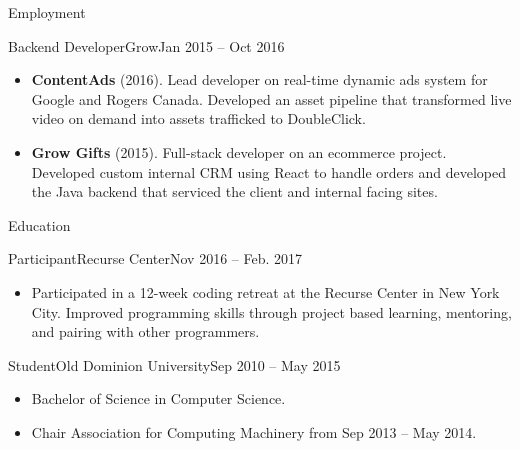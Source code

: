 \documentclass[]{mcdowellcv}
\begin{document}
\begin{cvsection}{Employment}
        \begin{cvsubsection}{Backend Developer}{Grow}{Jan 2015 – Oct 2016}
            \begin{itemize}
                \item \textbf{ContentAds} (2016). Lead developer on real-time dynamic ads system for Google and Rogers Canada. \newline 
                Developed an asset pipeline that transformed live video on demand into assets trafficked to DoubleClick.
            \end{itemize}
            \begin{itemize}
                \item \textbf{Grow Gifts} (2015). Full-stack developer on an ecommerce project. Developed custom internal CRM using React to handle orders and developed the Java backend that serviced the client and internal facing sites.
            \end{itemize}
        \end{cvsubsection}
    \end{cvsection}

    \begin{cvsection}{Education}
        \begin{cvsubsection}{Participant}{Recurse Center}{Nov 2016 – Feb. 2017}
            \begin{itemize}
                \item Participated in a 12-week coding retreat at the Recurse Center in New York City.\newline 
                Improved programming skills through project based learning, mentoring, and pairing with other programmers.
            \end{itemize}
        \end{cvsubsection}
        \begin{cvsubsection}{Student}{Old Dominion University}{Sep 2010 – May 2015}
            \begin{itemize}
                \item Bachelor of Science in Computer Science.
                \item Chair Association for Computing Machinery from Sep 2013 – May 2014.
            \end{itemize}
        \end{cvsubsection}
    \end{cvsection}
\end{document}
